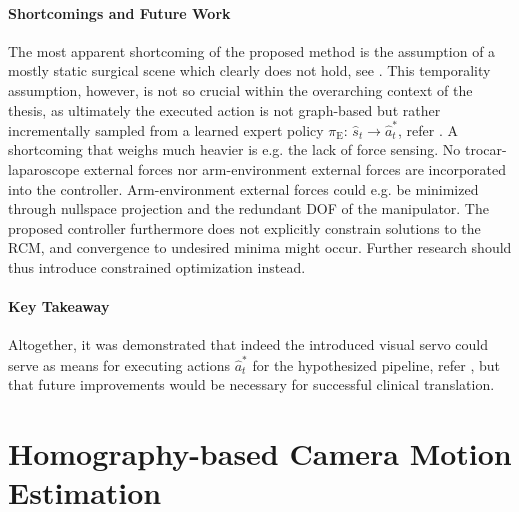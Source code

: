 \paragraph{Shortcomings and Future Work} The most apparent shortcoming of the proposed method is the assumption of a mostly static surgical scene which clearly does not hold, see . This temporality assumption, however, is not so crucial within the overarching context of the thesis, as ultimately the executed action is not graph-based but rather incrementally sampled from a learned expert policy $\pi_\text{E}:\, \hat{s}_t \rightarrow \hat{a}^*_t$, refer . A shortcoming that weighs much heavier is e.g. the lack of force sensing. No trocar-laparoscope external forces nor arm-environment external forces are incorporated into the controller. Arm-environment external forces could e.g. be minimized through nullspace projection and the redundant DOF of the manipulator. The proposed controller furthermore does not explicitly constrain solutions to the RCM, and convergence to undesired minima might occur. Further research should thus introduce constrained optimization instead.

\paragraph{Key Takeaway} Altogether, it was demonstrated that indeed the introduced visual servo could serve as means for executing actions $\hat{a}^*_t$ for the hypothesized pipeline, refer , but that future improvements would be necessary for successful clinical translation.

\section{Homography-based Camera Motion Estimation}
\label{con:sec:hom_est}
